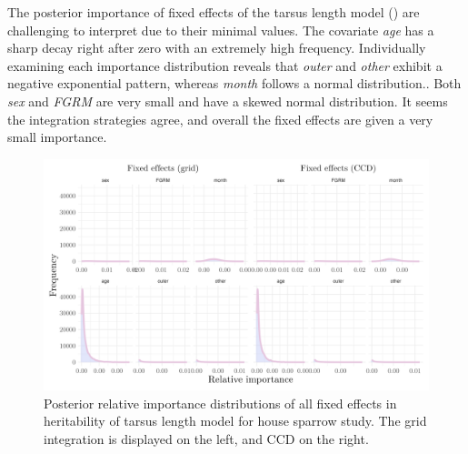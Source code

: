 The posterior importance of fixed effects of the tarsus length model () are challenging to interpret due to their minimal values. The covariate \textit{age} has a sharp decay right after zero with an extremely high frequency. Individually examining each importance distribution reveals that \textit{outer} and \textit{other} exhibit a negative exponential pattern, whereas \textit{month} follows a normal distribution.. Both \textit{sex} and \textit{FGRM} are very small and have a skewed normal distribution. It seems the integration strategies agree, and overall the fixed effects are given a very small importance.
\begin{figure}[H]%
  \centering
  \includegraphics[width=1\linewidth]{Figures/House sparrow study/Tarsus_fixed.png}
  \caption[Posterior relative importance distributions of all fixed effects in tarsus length model for house sparrow study]{Posterior relative importance distributions of all fixed effects in heritability of tarsus length model for house sparrow study. The grid integration is displayed on the left, and CCD on the right.}
  \label{fig:tarsus_fixed_sparrows}
\end{figure}

